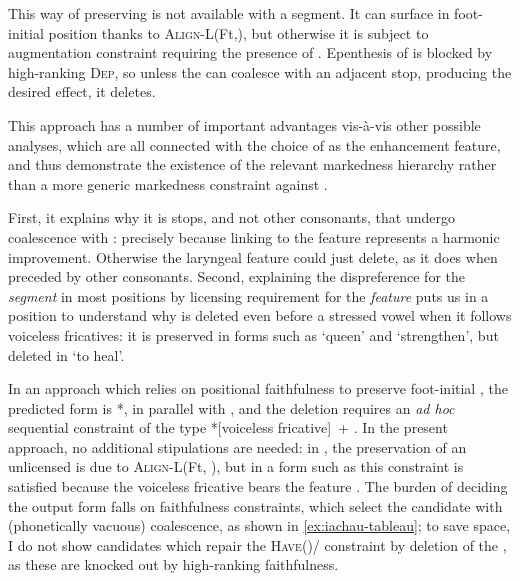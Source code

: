 This way of preserving  is not available with a \ipa{[h]} segment. It can surface in foot-initial position thanks to \textsc{Align-L}(Ft,), but otherwise it is subject to augmentation constraint requiring the presence of . Epenthesis of  is blocked by high-ranking \textsc{Dep}, so unless the \ipa{[h]} can coalesce with an adjacent stop, producing the desired effect, it deletes.

This approach has a number of important advantages vis-à-vis other possible analyses, which are all connected with the choice of  as the enhancement feature, and thus demonstrate the existence of the relevant markedness hierarchy rather than a more generic markedness constraint against \ipa{[h]}.

First, it explains why it is stops, and not other consonants, that undergo coalescence with \ipa{[h]}: precisely because linking  to the feature  represents a harmonic improvement. Otherwise the laryngeal feature could just delete, as it does when preceded by other consonants.  Second, explaining the dispreference for the \emph{segment} \ipa{[h]} in most positions by licensing requirement for the \emph{feature}  puts us in a position to understand why \ipa{[h]} is deleted even before a stressed vowel when it follows voiceless fricatives: it is preserved in forms such as \ipa{[brenˈhiːnes]} `queen' and \ipa{[krəvˈhai]} `strengthen', but deleted in \ipa{[jaˈχai]} `to heal'.

In an approach which relies on positional faithfulness to preserve foot-initial \ipa{[h]}, the predicted form is *\ipa{[jaχˈhai]}, in parallel with \ipa{[krəvˈhai]}, and the deletion requires an \emph{ad hoc} sequential constraint of the type *[voiceless fricative]~+ \ipa{[h]}. In the present approach, no additional stipulations are needed: in \ipa{[krəvˈhai]}, the preservation of an unlicensed \ipa{[h]} is due to \textsc{Align-L}(Ft, ), but in a form such as  this constraint is satisfied because the voiceless fricative bears the feature . The burden of deciding the output form falls on faithfulness constraints, which select the candidate with (phonetically vacuous) coalescence, as shown in \ref{ex:iachau-tableau}; to save space, I do not show candidates which repair the \textsc{Have}()/ constraint by deletion of the \ipa{[χ]}, as these are knocked out by high-ranking faithfulness.

